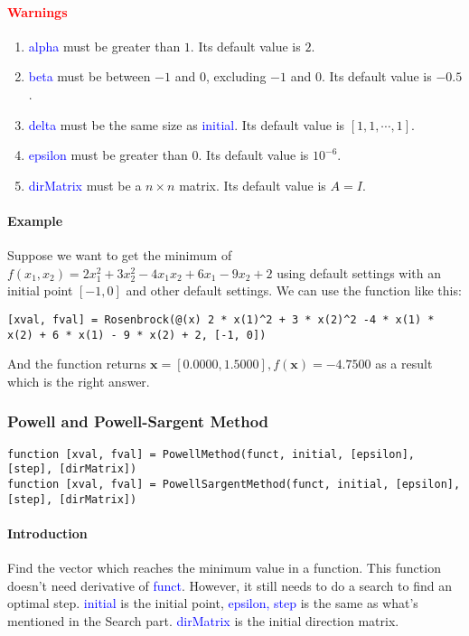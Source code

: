 \documentclass{article}
\begin{document}
\paragraph{\textcolor{red}{Warnings}}
\begin{enumerate}
    \item \textcolor{blue}{alpha} must be greater than $1$. Its default value is $2$.
    \item \textcolor{blue}{beta} must be between $-1$ and $0$, excluding $-1$ and $0$. Its default value is $-0.5$.
    \item \textcolor{blue}{delta} must be the same size as \textcolor{blue}{initial}. Its default value is $[1, 1, \cdots, 1]$.
    \item \textcolor{blue}{epsilon} must be greater than $0$. Its default value is $10^{-6}$.
    \item \textcolor{blue}{dirMatrix} must be a $n \times n$ matrix. Its default value is $A = I$.
\end{enumerate}

\paragraph{Example}
Suppose we want to get the minimum of $f(x_1, x_2) = 2 x_1^2 + 3 x_2^2 - 4 x_1 x_2 + 6 x_1 - 9 x_2 + 2$ using default settings with an initial point $[-1, 0]$ and other default settings. We can use the function like this:
\begin{verbatim}
[xval, fval] = Rosenbrock(@(x) 2 * x(1)^2 + 3 * x(2)^2 -4 * x(1) * x(2) + 6 * x(1) - 9 * x(2) + 2, [-1, 0])
\end{verbatim}

And the function returns $\mathbf{x} = [0.0000, 1.5000], f(\mathbf{x}) = -4.7500$ as a result which is the right answer.

\subsubsection{Powell and Powell-Sargent Method}
\begin{verbatim}
function [xval, fval] = PowellMethod(funct, initial, [epsilon], [step], [dirMatrix])
function [xval, fval] = PowellSargentMethod(funct, initial, [epsilon], [step], [dirMatrix])
\end{verbatim}

\paragraph{Introduction}
Find the vector which reaches the minimum value in a function. This function doesn't need derivative of \textcolor{blue}{funct}. However, it still needs to do a search to find an optimal step. \textcolor{blue}{initial} is the initial point, \textcolor{blue}{epsilon, step} is the same as what's mentioned in the Search part. \textcolor{blue}{dirMatrix} is the initial direction matrix.
\end{document}
